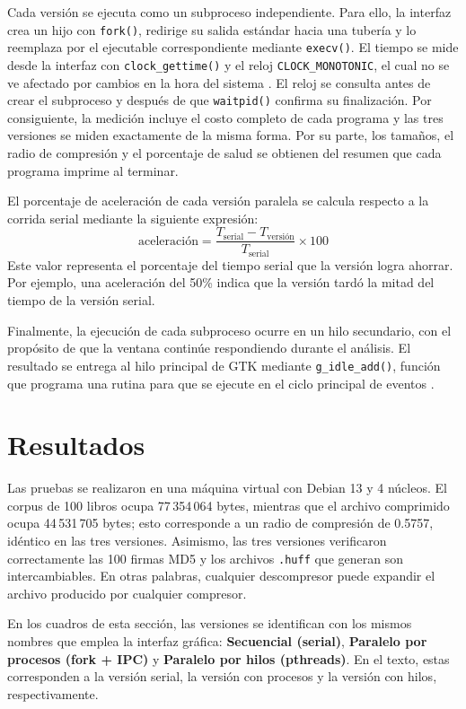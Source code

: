 \documentclass{report}
\begin{document}
Cada versión se ejecuta como un subproceso independiente. Para ello, la interfaz crea un hijo con \texttt{fork()}, redirige su salida estándar hacia una tubería y lo reemplaza por el ejecutable correspondiente mediante \texttt{execv()}. El tiempo se mide desde la interfaz con \texttt{clock\_gettime()} y el reloj \texttt{CLOCK\_MONOTONIC}, el cual no se ve afectado por cambios en la hora del sistema \cite{manclock}. El reloj se consulta antes de crear el subproceso y después de que \texttt{waitpid()} confirma su finalización. Por consiguiente, la medición incluye el costo completo de cada programa y las tres versiones se miden exactamente de la misma forma. Por su parte, los tamaños, el radio de compresión y el porcentaje de salud se obtienen del resumen que cada programa imprime al terminar.

El porcentaje de aceleración de cada versión paralela se calcula respecto a la corrida serial mediante la siguiente expresión:
\[
    \mbox{aceleración} = \frac{T_{\mbox{serial}} - T_{\mbox{versión}}}{T_{\mbox{serial}}} \times 100
\]
Este valor representa el porcentaje del tiempo serial que la versión logra ahorrar. Por ejemplo, una aceleración del 50\% indica que la versión tardó la mitad del tiempo de la versión serial.

Finalmente, la ejecución de cada subproceso ocurre en un hilo secundario, con el propósito de que la ventana continúe respondiendo durante el análisis. El resultado se entrega al hilo principal de GTK mediante \texttt{g\_idle\_add()}, función que programa una rutina para que se ejecute en el ciclo principal de eventos \cite{glibidle}.

\section{Resultados}\label{resultados}

Las pruebas se realizaron en una máquina virtual con Debian 13 y 4 núcleos. El corpus de 100 libros ocupa 77\,354\,064 bytes, mientras que el archivo comprimido ocupa 44\,531\,705 bytes; esto corresponde a un radio de compresión de 0.5757, idéntico en las tres versiones. Asimismo, las tres versiones verificaron correctamente las 100 firmas MD5 y los archivos \texttt{.huff} que generan son intercambiables. En otras palabras, cualquier descompresor puede expandir el archivo producido por cualquier compresor.

En los cuadros de esta sección, las versiones se identifican con los mismos nombres que emplea la interfaz gráfica: \textbf{Secuencial (serial)}, \textbf{Paralelo por procesos (fork + IPC)} y \textbf{Paralelo por hilos (pthreads)}. En el texto, estas corresponden a la versión serial, la versión con procesos y la versión con hilos, respectivamente.
\end{document}
